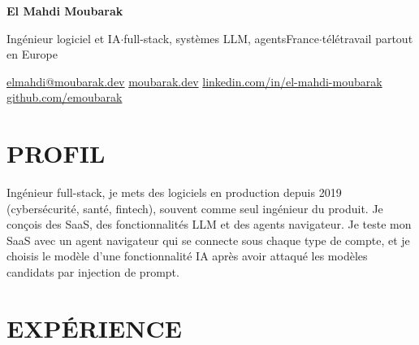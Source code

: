 \documentclass[a4paper,10pt]{article}
\newcommand{\sep}{\unskip\nobreak\hspace{0.45em}{\color{muted}$\cdot$}\hspace{0.45em}\ignorespaces}
\newcommand{\contact}[2]{\href{#1}{\color{onband}#2}}
\begin{document}
%
\vspace*{-1pt}%
{\fontsize{27}{32}\selectfont\bfseries\color{white} El Mahdi Moubarak}\par\vspace{5pt}
{\large\color{accentlight} Ingénieur logiciel et IA{\color{onband}\enspace$\cdot$\enspace}full-stack, systèmes LLM, agents}\hfill{\color{onband}France\enspace$\cdot$\enspace télétravail partout en Europe}\par\vspace{7pt}
{\fontsize{10}{13}\selectfont\color{onband}\contact{mailto:elmahdi@moubarak.dev}{elmahdi@moubarak.dev}\sep
\contact{https://moubarak.dev}{moubarak.dev}\sep
\contact{https://www.linkedin.com/in/el-mahdi-moubarak}{linkedin.com/in/el-mahdi-moubarak}\sep
\contact{https://github.com/emoubarak}{github.com/emoubarak}}\par
\vspace{20pt}

\section*{PROFIL}
Ingénieur full-stack, je mets des logiciels en production depuis 2019 (cybersécurité, santé, fintech), souvent comme seul ingénieur du produit. Je conçois des SaaS, des fonctionnalités LLM et des agents navigateur. Je teste mon SaaS avec un agent navigateur qui se connecte sous chaque type de compte, et je choisis le modèle d'une fonctionnalité IA après avoir attaqué les modèles candidats par injection de prompt.

\section*{EXPÉRIENCE}
\end{document}
